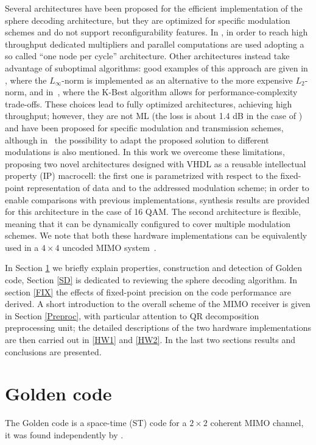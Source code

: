 \documentclass[12pt,onecolumn,draftclsnofoot]{IEEEtran}
\begin{document}
Several architectures have been proposed for the efficient
implementation of the sphere decoding architecture, but they are
optimized for specific modulation schemes and do not support
reconfigurability features. In \cite[ASIC-I]{ethvlsi}, in order
to reach high throughput dedicated multipliers and parallel
computations are used adopting a so called ``one node per cycle''
architecture. Other architectures instead take advantage of suboptimal algorithms: good examples of this
approach are given in \cite[ASIC-II]{ethvlsi},
where the $L_\infty$-norm is implemented as an alternative to the more expensive
$L_2$-norm, and in~\cite{lundvlsi}, where the K-Best algorithm allows for
performance-complexity trade-offs.
These choices lead to fully optimized architectures,
achieving high throughput; however, they are not ML 
(the loss is about 1.4 dB in the case of  \cite[ASIC-II]{ethvlsi}) and have
been proposed for specific modulation and transmission schemes, 
although in~\cite{ethvlsi} the possibility to adapt the proposed solution to 
different modulations is also mentioned.
In this work we
overcome these limitations, proposing two novel architectures
designed with VHDL as a reusable intellectual property (IP)
macrocell: the first one is parametrized with respect to the
fixed-point representation of data and to the addressed modulation
scheme; in order to enable comparisons with previous
implementations, synthesis results are provided for this
architecture in the case of 16 QAM. The second architecture is
flexible, meaning that it can be dynamically configured to cover
multiple modulation schemes. We note that both these hardware
implementations can be equivalently used in a $4\times 4$ uncoded MIMO system~\cite{gigabit2}.


 In Section \ref{GC} we briefly explain properties,
construction and detection of Golden code, Section \ref{SD} is
dedicated to reviewing the sphere decoding algorithm. In
section \ref{FIX} the effects of fixed-point precision on the code
performance are derived. A short introduction to the overall scheme
of the MIMO receiver is given in Section \ref{Preproc}, with
particular attention to QR decomposition preprocessing unit; the
detailed descriptions of the two hardware implementations are then
carried out in \ref{HW1} and \ref{HW2}. In the last two sections
results and conclusions are presented.





\section{Golden code}
\label{GC}
The Golden code is a space-time (ST) code for a $2\times2$ coherent MIMO channel,
it was found independently by \cite{Golden1, Golden2, Golden3}.
\end{document}
